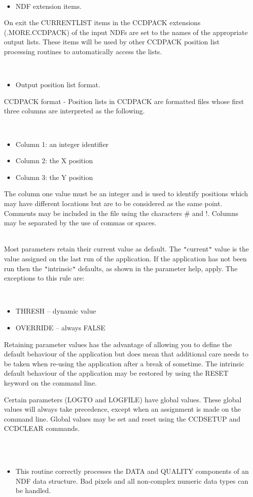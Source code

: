 \documentclass[twoside,11pt]{article}
\newcommand{\htmlref}[2]{#1}
\renewcommand{\_}{\texttt{\symbol{95}}}
\newcommand{\qt}[1]{{\tt "}#1{\tt "}}
\newcommand{\xroutine}[1]{\htmlref{{\sc #1}}{#1}}
\newcommand{\sstdiytopic}[2]{\item[#1:] \mbox{} \\[1.3ex] #2}
\newcommand{\sstimplementationstatus}[1]{
   \item[{Implementation Status:}] \mbox{} \\[1.3ex] #1}
\newcommand{\sstitemlist}[1]{
  \mbox{} \\
  \vspace{-3.5ex}
  \begin{itemize}
     #1
  \end{itemize}
}
\newcommand{\sstitem}{\item}
\newcommand{\sstdiytopic}[2]{\item[{#1}] #2 }
\newcommand{\sstimplementationstatus}[1]{
      \item[Implementation Status:] #1
   }
\newcommand{\sstitemlist}[1]{
      \begin{itemize}
         #1
      \end{itemize}
      \\
   }
\newcommand{\sstitem}{\item}
\begin{document}
{{      \sstitemlist{

         \sstitem
         NDF extension items.

      }
        On exit the CURRENT\_LIST items in the CCDPACK extensions
        (.MORE.CCDPACK) of the input NDFs are set to the names of the
        appropriate output lists. These items will be used by other
        CCDPACK position list processing routines to automatically
        access the lists.

      \sstitemlist{

         \sstitem
         Output position list format.

      }
        CCDPACK format - Position lists in CCDPACK are formatted files
        whose first three columns are interpreted as the following.

      \sstitemlist{

         \sstitem
              Column 1: an integer identifier

         \sstitem
              Column 2: the X position

         \sstitem
              Column 3: the Y position

      }
        The column one value must be an integer and is used to identify
        positions which may have different locations but are to be
        considered as the same point. Comments may be included in the
        file using the characters \# and !. Columns may be separated by
        the use of commas or spaces.
   }
   \sstdiytopic{
      Behaviour of parameters
   } {
      Most parameters retain their current value as default. The
      \qt{current} value is the value assigned on the last run of the
      application. If the application has not been run then the
      \qt{intrinsic} defaults, as shown in the parameter help, apply.
      The exceptions to this rule are:
      \sstitemlist{

         \sstitem
            THRESH   -- dynamic value
         \sstitem
            OVERRIDE -- always FALSE

      }
      Retaining parameter values has the advantage of allowing you to
      define the default behaviour of the application but does mean
      that additional care needs to be taken when re-using the
      application after a break of sometime. The intrinsic default
      behaviour of the application may be restored by using the RESET
      keyword on the command line.

      Certain parameters (LOGTO and LOGFILE) have global values. These
      global values will always take precedence, except when an
      assignment is made on the command line.  Global values may be set
      and reset using the \xroutine{CCDSETUP} and \xroutine{CCDCLEAR} commands.
   }
   \sstimplementationstatus{
      \sstitemlist{

         \sstitem
         This routine correctly processes the DATA and QUALITY components
           of an NDF data structure. Bad pixels and all non-complex numeric
           data types can be handled.
      }
   }
}
\end{document}

